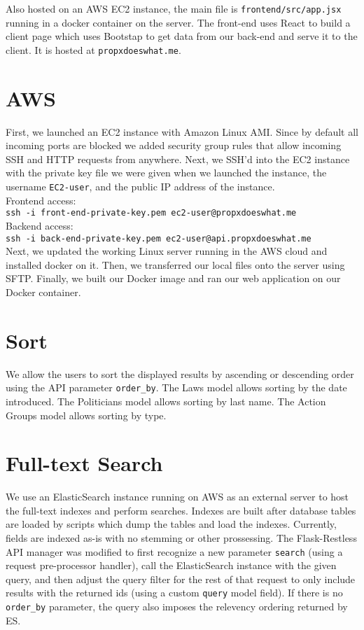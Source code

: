 \documentclass[12pt]{article}
\newcommand{\code}[1]{\texttt{#1}}
\begin{document}
Also hosted on an AWS EC2 instance, the main file is \code{frontend/src/app.jsx} running in a docker container on the server. The front-end uses React to build a client page which uses Bootstap to get data from our back-end and serve it to the client. It is hosted at \code{propxdoeswhat.me}.

\section{AWS}

First, we launched an EC2 instance with Amazon Linux AMI. Since by default all incoming ports are blocked we added security group rules that allow incoming SSH and HTTP requests from anywhere. Next, we SSH'd into the EC2 instance with the private key file we were given when we launched the instance, the username \code{EC2-user}, and the public IP address of the instance. \\

Frontend access: \\
\code{ssh -i front-end-private-key.pem ec2-user@propxdoeswhat.me} \\
Backend access: \\
\code{ssh -i back-end-private-key.pem ec2-user@api.propxdoeswhat.me} \\

Next, we updated the working Linux server running in the AWS cloud and installed docker on it. Then, we transferred our local files onto the server using SFTP. Finally, we built our Docker image and ran our web application on our Docker container.

\section{Sort}

We allow the users to sort the displayed results by ascending or descending order using the API parameter \code{order\_by}. The Laws model allows sorting by the date introduced. The Politicians model allows sorting by last name. The Action Groups model allows sorting by type.

\section{Full-text Search}

We use an ElasticSearch instance running on AWS as an external server to host the full-text indexes and perform searches. Indexes are built after database tables are loaded by scripts which dump the tables and load the indexes. Currently, fields are indexed as-is with no stemming or other prossessing. The Flask-Restless API manager was modified to first recognize a new parameter \code{search} (using a request pre-processor handler), call the ElasticSearch instance with the given query, and then adjust the query filter for the rest of that request to only include results with the returned ids (using a custom \code{query} model field). If there is no \code{order\_by} parameter, the query also imposes the relevency ordering returned by ES.
\end{document}
